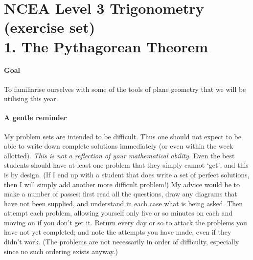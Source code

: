 \documentclass[answers]{exam}
\begin{document}
\section*{NCEA Level 3 Trigonometry (exercise set)\\1. The Pythagorean Theorem}
\paragraph{Goal} To familiarise ourselves with some of the tools of plane geometry
that we will be utilising this year.

\paragraph{A gentle reminder} My problem sets are intended to be difficult. Thus one should not expect to be able
to write down complete solutions immediately (or even within the week allotted). \emph{This is not a reflection of
your mathematical ability.} Even the best students should have at least one problem that they simply cannot `get',
and this is by design. (If I end up with a student that does write a set of perfect solutions, then I will simply add
another more difficult problem!) My advice would be to make a number of passes: first read all the questions, draw any
diagrams that have not been supplied, and understand in each case what is being asked. Then attempt each problem,
allowing yourself only five or so minutes on each and moving on if you don't get it. Return every day or so to attack
the problems you have not yet completed; and note the attempts you have made, even if they didn't work. (The problems
are not necessarily in order of difficulty, especially since no such ordering exists anyway.)
\end{document}
